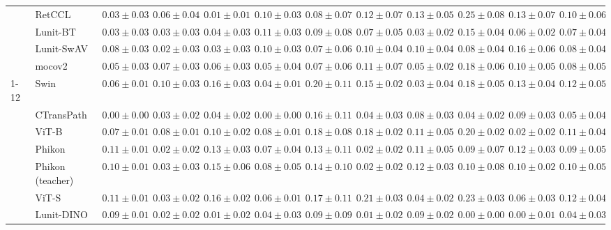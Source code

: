 \begin{tabular}{ll|cccc|c|cccc|c}
 & RetCCL & $0.03 \pm 0.03$ & $0.06 \pm 0.04$ & $\mathbf{0.01 \pm 0.01}$ & $0.10 \pm 0.03$ & $0.08 \pm 0.07$ & $0.12 \pm 0.07$ & $0.13 \pm 0.05$ & $0.25 \pm 0.08$ & $0.13 \pm 0.07$ & $0.10 \pm 0.06$ \\
 & Lunit-BT & $0.03 \pm 0.03$ & $0.03 \pm 0.03$ & $0.04 \pm 0.03$ & $0.11 \pm 0.03$ & $0.09 \pm 0.08$ & $0.07 \pm 0.05$ & $\mathbf{0.03 \pm 0.02}$ & $0.15 \pm 0.04$ & $0.06 \pm 0.02$ & $0.07 \pm 0.04$ \\
 & Lunit-SwAV & $0.08 \pm 0.03$ & $\mathbf{0.02 \pm 0.03}$ & $0.03 \pm 0.03$ & $0.10 \pm 0.03$ & $0.07 \pm 0.06$ & $0.10 \pm 0.04$ & $0.10 \pm 0.04$ & $0.08 \pm 0.04$ & $0.16 \pm 0.06$ & $0.08 \pm 0.04$ \\
 & mocov2 & $0.05 \pm 0.03$ & $0.07 \pm 0.03$ & $0.06 \pm 0.03$ & $0.05 \pm 0.04$ & $0.07 \pm 0.06$ & $0.11 \pm 0.07$ & $0.05 \pm 0.02$ & $0.18 \pm 0.06$ & $0.10 \pm 0.05$ & $0.08 \pm 0.05$ \\
\cline{1-12}
\multirow[t]{12}{*}{Mean pool} & Swin & $0.06 \pm 0.01$ & $0.10 \pm 0.03$ & $0.16 \pm 0.03$ & $0.04 \pm 0.01$ & $0.20 \pm 0.11$ & $0.15 \pm 0.02$ & $0.03 \pm 0.04$ & $0.18 \pm 0.05$ & $0.13 \pm 0.04$ & $0.12 \pm 0.05$ \\
 & CTransPath & $\mathbf{0.00 \pm 0.00}$ & $0.03 \pm 0.02$ & $0.04 \pm 0.02$ & $\mathbf{0.00 \pm 0.00}$ & $0.16 \pm 0.11$ & $0.04 \pm 0.03$ & $0.08 \pm 0.03$ & $0.04 \pm 0.02$ & $0.09 \pm 0.03$ & $0.05 \pm 0.04$ \\
 & ViT-B & $0.07 \pm 0.01$ & $0.08 \pm 0.01$ & $0.10 \pm 0.02$ & $0.08 \pm 0.01$ & $0.18 \pm 0.08$ & $0.18 \pm 0.02$ & $0.11 \pm 0.05$ & $0.20 \pm 0.02$ & $0.02 \pm 0.02$ & $0.11 \pm 0.04$ \\
 & Phikon & $0.11 \pm 0.01$ & $0.02 \pm 0.02$ & $0.13 \pm 0.03$ & $0.07 \pm 0.04$ & $0.13 \pm 0.11$ & $0.02 \pm 0.02$ & $0.11 \pm 0.05$ & $0.09 \pm 0.07$ & $0.12 \pm 0.03$ & $0.09 \pm 0.05$ \\
 & Phikon (teacher) & $0.10 \pm 0.01$ & $0.03 \pm 0.03$ & $0.15 \pm 0.06$ & $0.08 \pm 0.05$ & $0.14 \pm 0.10$ & $0.02 \pm 0.02$ & $0.12 \pm 0.03$ & $0.10 \pm 0.08$ & $0.10 \pm 0.02$ & $0.10 \pm 0.05$ \\
 & ViT-S & $0.11 \pm 0.01$ & $0.03 \pm 0.02$ & $0.16 \pm 0.02$ & $0.06 \pm 0.01$ & $0.17 \pm 0.11$ & $0.21 \pm 0.03$ & $0.04 \pm 0.02$ & $0.23 \pm 0.03$ & $0.06 \pm 0.03$ & $0.12 \pm 0.04$ \\
 & Lunit-DINO & $0.09 \pm 0.01$ & $0.02 \pm 0.02$ & $\mathbf{0.01 \pm 0.02}$ & $0.04 \pm 0.03$ & $\mathbf{0.09 \pm 0.09}$ & $\mathbf{0.01 \pm 0.02}$ & $0.09 \pm 0.02$ & $\mathbf{0.00 \pm 0.00}$ & $\mathbf{0.00 \pm 0.01}$ & $\mathbf{0.04 \pm 0.03}$ \\

\end{tabular}
